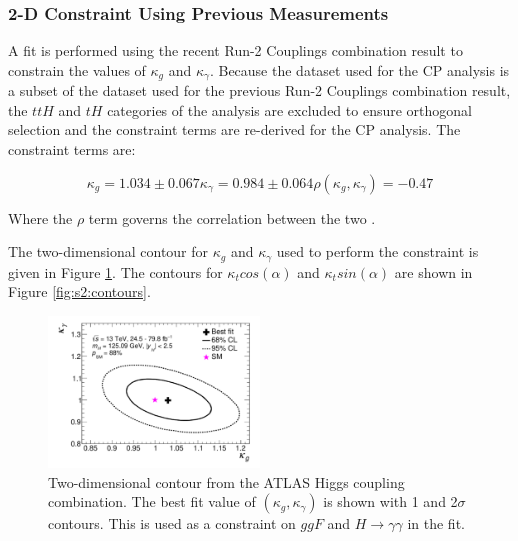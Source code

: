 \subsubsection{2-D Constraint Using Previous Measurements}

A fit is performed using the recent Run-2 Couplings combination result \cite{PhysRevD.101.012002} to constrain the values of $\kappa_{g}$ and $\kappa_{\gamma}$. Because the dataset used for the CP analysis is a subset of the dataset used for the previous Run-2 Couplings combination result, the $ttH$ and $tH$ categories of the analysis are excluded to ensure orthogonal selection and the constraint terms are re-derived for the CP analysis. The constraint terms are:

\begin{equation}
\kappa_{g} = 1.034 \pm 0.067
\kappa_{\gamma} = 0.984 \pm 0.064
\rho(\kappa_{g}, \kappa_{\gamma}) = -0.47
\end{equation}

Where the $\rho$ term governs the correlation between the two \cite{kappaFW}. 

The two-dimensional contour for $\kappa_{g}$ and $\kappa_{\gamma}$ used to perform the constraint is given in Figure \ref{fig:combkgky}. The contours for $\kappa_{t}cos(\alpha)$ and $\kappa_{t}sin(\alpha)$ are shown in Figure \ref{fig:s2:contours}.

\begin{figure}[htbp]
  \centering
\includegraphics[width=0.5\textwidth]{figures/tthcp_results/combination_kgky.pdf}
\caption{Two-dimensional contour from the ATLAS Higgs coupling combination. The best fit value of $(\kappa_g,\kappa_\gamma)$ is shown with 1 and 2$\sigma$ contours. This is used as a constraint on $ggF$ and $H \rightarrow \gamma\gamma$ in the fit. \label{fig:combkgky}}
\end{figure}

